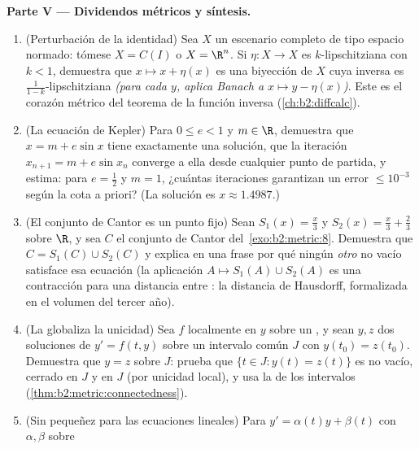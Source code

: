 \begin{problem}
\medskip
\noindent\textbf{Parte V --- Dividendos métricos y síntesis.}
\begin{enumerate}[resume]
  \item (Perturbación de la identidad) Sea $X$ un escenario
        completo de tipo espacio normado: tómese $X = C(I)$ o $X =
        \R^n$. Si $\eta \colon X \to X$ es $k$-lipschitziana con $k
        < 1$, demuestra que $x \mapsto x + \eta(x)$ es una
        biyección de $X$ cuya inversa es
        $\frac1{1-k}$-lipschitziana \emph{(para cada $y$, aplica
        Banach a $x \mapsto y - \eta(x)$)}. Este es el corazón
        métrico del teorema de la función inversa
        (\cref{ch:b2:diffcalc}).
  \item (La ecuación de Kepler) Para $0 \leq e < 1$ y $m \in \R$,
        demuestra que $x = m + e\sin x$ tiene exactamente una
        solución, que la iteración $x_{n+1} = m + e\sin x_n$
        converge a ella desde cualquier punto de partida, y estima:
        para $e = \frac12$ y $m = 1$, ¿cuántas iteraciones
        garantizan un error $\leq 10^{-3}$ según la cota a priori?
        (La solución es $x \approx 1.4987$.)
  \item (El conjunto de Cantor es un punto fijo) Sean $S_1(x) =
        \frac x3$ y $S_2(x) = \frac x3 + \frac23$ sobre $\R$, y sea
        $C$ el conjunto de Cantor del~\cref{exo:b2:metric:8}.
        Demuestra que $C = S_1(C) \cup S_2(C)$ y explica en una
        frase por qué ningún \emph{otro}  no vacío
        satisface esa ecuación (la aplicación $A \mapsto S_1(A)
        \cup S_2(A)$ es una contracción para una distancia entre
        : la distancia de Hausdorff, formalizada en el
        volumen del tercer año).
  \item (La  globaliza la unicidad) Sea $f$ localmente
         en $y$ sobre un , y sean $y, z$ dos
        soluciones de $y' = f(t, y)$ sobre un intervalo común $J$
        con $y(t_0) = z(t_0)$. Demuestra que $y = z$ sobre $J$:
        prueba que $\{t \in J : y(t) = z(t)\}$ es no vacío, cerrado
        en $J$ y  en $J$ (por unicidad local), y usa la
         de los intervalos
        (\cref{thm:b2:metric:connectedness}).
  \item (Sin pequeñez para las ecuaciones lineales) Para $y' =
        \alpha(t)y + \beta(t)$ con $\alpha, \beta$  sobre

\end{enumerate}
\end{problem}
